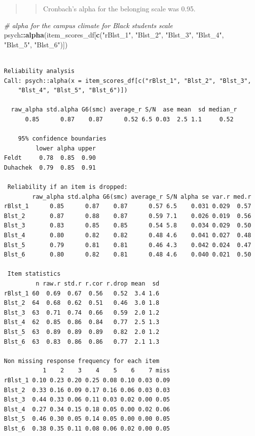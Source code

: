 \documentclass[
  11pt,
]{book}
\newenvironment{Shaded}{\begin{snugshade}}{\end{snugshade}}
\newcommand{\CommentTok}[1]{\textcolor[rgb]{0.37,0.37,0.37}{\textit{#1}}}
\newcommand{\FunctionTok}[1]{\textcolor[rgb]{0.27,0.27,0.27}{\textbf{#1}}}
\newcommand{\NormalTok}[1]{#1}
\newcommand{\SpecialCharTok}[1]{\textcolor[rgb]{0.43,0.43,0.43}{\textbf{#1}}}
\newcommand{\StringTok}[1]{\textcolor[rgb]{0.5,0.5,0.5}{#1}}
\begin{document}
\begin{quote}
\begin{quote}
Cronbach's alpha for the belonging scale was 0.95.
\end{quote}
\end{quote}

\begin{Shaded}
\begin{Highlighting}[]
\CommentTok{\# alpha for the campus climate for Black students scale}
\NormalTok{psych}\SpecialCharTok{::}\FunctionTok{alpha}\NormalTok{(item\_scores\_df[}\FunctionTok{c}\NormalTok{(}\StringTok{"rBlst\_1"}\NormalTok{, }\StringTok{"Blst\_2"}\NormalTok{, }\StringTok{"Blst\_3"}\NormalTok{, }\StringTok{"Blst\_4"}\NormalTok{,}
    \StringTok{"Blst\_5"}\NormalTok{, }\StringTok{"Blst\_6"}\NormalTok{)])}
\end{Highlighting}
\end{Shaded}

\begin{verbatim}

Reliability analysis   
Call: psych::alpha(x = item_scores_df[c("rBlst_1", "Blst_2", "Blst_3", 
    "Blst_4", "Blst_5", "Blst_6")])

  raw_alpha std.alpha G6(smc) average_r S/N  ase mean  sd median_r
      0.85      0.87    0.87      0.52 6.5 0.03  2.5 1.1     0.52

    95% confidence boundaries 
         lower alpha upper
Feldt     0.78  0.85  0.90
Duhachek  0.79  0.85  0.91

 Reliability if an item is dropped:
        raw_alpha std.alpha G6(smc) average_r S/N alpha se var.r med.r
rBlst_1      0.85      0.87    0.87      0.57 6.5    0.031 0.029  0.57
Blst_2       0.87      0.88    0.87      0.59 7.1    0.026 0.019  0.56
Blst_3       0.83      0.85    0.85      0.54 5.8    0.034 0.029  0.50
Blst_4       0.80      0.82    0.82      0.48 4.6    0.041 0.027  0.48
Blst_5       0.79      0.81    0.81      0.46 4.3    0.042 0.024  0.47
Blst_6       0.80      0.82    0.81      0.48 4.6    0.040 0.021  0.50

 Item statistics 
         n raw.r std.r r.cor r.drop mean  sd
rBlst_1 60  0.69  0.67  0.56   0.52  3.4 1.6
Blst_2  64  0.68  0.62  0.51   0.46  3.0 1.8
Blst_3  63  0.71  0.74  0.66   0.59  2.0 1.2
Blst_4  62  0.85  0.86  0.84   0.77  2.5 1.3
Blst_5  63  0.89  0.89  0.89   0.82  2.0 1.2
Blst_6  63  0.83  0.86  0.86   0.77  2.1 1.3

Non missing response frequency for each item
           1    2    3    4    5    6    7 miss
rBlst_1 0.10 0.23 0.20 0.25 0.08 0.10 0.03 0.09
Blst_2  0.33 0.16 0.09 0.17 0.16 0.06 0.03 0.03
Blst_3  0.44 0.33 0.06 0.11 0.03 0.02 0.00 0.05
Blst_4  0.27 0.34 0.15 0.18 0.05 0.00 0.02 0.06
Blst_5  0.46 0.30 0.05 0.14 0.05 0.00 0.00 0.05
Blst_6  0.38 0.35 0.11 0.08 0.06 0.02 0.00 0.05
\end{verbatim}
\end{document}
